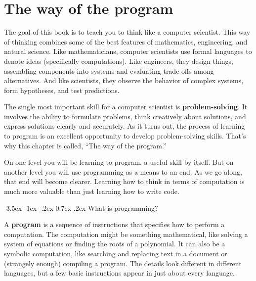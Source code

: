 \documentclass[12pt]{book}
\makeatletter
\theoremstyle{exercise}
\renewcommand{\section}{\@startsection{section}{1}{\z@}%
    {-3.5ex \@plus -1ex \@minus -.2ex}%
    {0.7ex \@plus.2ex}%
    {\normalfont\Large\bfseries}}
\makeatother
\begin{document}
\fi

\mainmatter


\chapter{The way of the program}
\label{theway}

The goal of this book is to teach you to think like a computer scientist.
This way of thinking combines some of the best features of mathematics, engineering, and natural science.
Like mathematicians, computer scientists use formal languages to denote ideas (specifically computations).
Like engineers, they design things, assembling components into systems and evaluating trade-offs among alternatives.
And like scientists, they observe the behavior of complex systems, form hypotheses, and test predictions.

The single most important skill for a computer scientist is {\bf problem-solving}.
It involves the ability to formulate problems, think creatively about solutions, and express solutions clearly and accurately.
As it turns out, the process of learning to program is an excellent opportunity to develop problem-solving skills.
That's why this chapter is called, ``The way of the program.''

On one level you will be learning to program, a useful skill by itself.
But on another level you will use programming as a means to an end.
As we go along, that end will become clearer.
Learning how to think in terms of computation is much more valuable than just learning how to write code.


\section{What is programming?}

A {\bf program} is a sequence of instructions that specifies how to perform a computation.
The computation might be something mathematical, like solving a system of equations or finding the roots of a polynomial.
It can also be a symbolic computation, like searching and replacing text in a document or (strangely enough) compiling a program.
The details look different in different languages, but a few basic instructions appear in just about every language.
\end{document}
